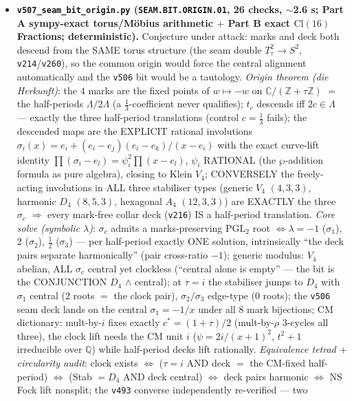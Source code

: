 \documentclass[11pt]{article}
\begin{document}
\begin{itemize}[leftmargin=1.5em]
\item \textbf{\texttt{v507\_seam\_bit\_origin.py} (\texttt{SEAM.BIT.ORIGIN.01}, 26 checks, $\sim$2.6 s;
Part A sympy-exact torus/M\"obius arithmetic $+$ Part B exact $\mathrm{Cl}(16)$ Fractions;
deterministic).} Conjecture under attack: marks and deck both descend from the SAME torus structure
(the seam double $T^2_\tau\to S^2$, \texttt{v214}/\texttt{v260}), so the common origin would force
the central alignment automatically and the \texttt{v506} bit would be a tautology.
\emph{Origin theorem (die Herkunft)}: the $4$ marks are the fixed points of $w\mapsto-w$ on
$\mathbb C/(\mathbb Z{+}\tau\mathbb Z)$ $=$ the half-periods $\Lambda/2\Lambda$ (a
$\tfrac13$-coefficient never qualifies); $t_c$ descends iff $2c\in\Lambda$ --- exactly the three
half-period translations (control $c=\tfrac13$ fails); the descended maps are the EXPLICIT rational
involutions $\sigma_i(x)=e_i+(e_i{-}e_j)(e_i{-}e_k)/(x{-}e_i)$ with the exact curve-lift identity
$\prod(\sigma_i{-}e_l)=\psi_i^2\prod(x{-}e_l)$, $\psi_i$ RATIONAL (the $\wp$-addition formula as
pure algebra), closing to Klein $V_4$; CONVERSELY the freely-acting involutions in ALL three
stabiliser types (generic $V_4$ $(4,3,3)$, harmonic $D_4$ $(8,5,3)$, hexagonal $A_4$ $(12,3,3)$)
are EXACTLY the three $\sigma_c$ $\Rightarrow$ every mark-free collar deck (\texttt{v216}) IS a
half-period translation. \emph{Core solve (symbolic $\lambda$)}: $\sigma_c$ admits a
marks-preserving $\mathrm{PGL}_2$ root $\iff\lambda=-1$ ($\sigma_1$), $2$ ($\sigma_2$), $\tfrac12$
($\sigma_3$) --- per half-period exactly ONE solution, intrinsically ``the deck pairs separate
harmonically'' (pair cross-ratio $-1$); generic modulus: $V_4$ abelian, ALL $\sigma_c$ central yet
clockless (``central alone is empty'' --- the bit is the CONJUNCTION $D_4$ $\wedge$ central); at
$\tau=i$ the stabiliser jumps to $D_4$ with $\sigma_1$ central ($2$ roots $=$ the clock pair),
$\sigma_2/\sigma_3$ edge-type ($0$ roots); the \texttt{v506} seam deck lands on the central
$\sigma_1=-1/x$ under all $8$ mark bijections; CM dictionary: mult-by-$i$ fixes exactly
$c^*=(1{+}\tau)/2$ (mult-by-$\rho$ $3$-cycles all three), the clock lift needs the CM unit $i$
($\psi=2i/(x{+}1)^2$, $t^2{+}1$ irreducible over $\mathbb Q$) while half-period decks lift
rationally. \emph{Equivalence tetrad $+$ circularity audit}: clock exists $\iff$ ($\tau{=}i$ AND
deck $=$ the CM-fixed half-period) $\iff$ (Stab $=D_4$ AND deck central) $\iff$ deck pairs harmonic
$\iff$ NS Fock lift nonsplit; the \texttt{v493} converse independently re-verified --- two

\end{itemize}
\end{document}
